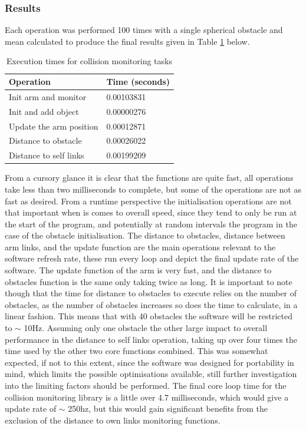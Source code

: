 \documentclass[a4paper, 11.5pt, conference]{ieeeconf}      %
\begin{document}
\subsubsection{Results}
Each operation was performed 100 times with a single spherical obstacle and mean calculated to produce the final results given in Table \ref{table:Function Times} below.

\begin{table}[H]
	\centering
	\begin{tabular}{|l|l|}
		\hline
		Operation & Time (seconds) \\ \hline
		Init arm and monitor   & 0.00103831     \\ \hline
		Init and add object    & 0.00000276     \\ \hline
		Update the arm position& 0.00012871     \\ \hline
		Distance to obstacle   & 0.00026022     \\ \hline
		Distance to self links & 0.00199209     \\ \hline
	\end{tabular}
	\caption{Execution times for collision monitoring tasks}
	\label{table:Function Times}
\end{table}
From a cursory glance it is clear that the functions are quite fast, all operations take less than two milliseconds to complete, but some of the operations are not as fast as desired. From a runtime perspective the initialisation operations are not that important when is comes to overall speed, since they tend to only be run at the start of the program, and potentially at random intervals the program in the case of the obstacle initialisation. The distance to obstacles, distance between arm links, and the update function are the main operations relevant to the software refresh rate, these run every loop and depict the final update rate of the software. The update function of the arm is very fast, and the distance to obstacles function is the same only taking twice as long. It is important to note though that the time for distance to obstacles to execute relies on the number of obstacles, as the number of obstacles increases so does the time to calculate, in a linear fashion. This means that with 40 obstacles the software will be restricted to $\sim$ 10Hz. Assuming only one obstacle the other large impact to overall performance in the distance to self links operation, taking up over four times the time used by the other two core functions combined. This was somewhat expected, if not to this extent, since the software was designed for portability in mind, which limits the possible optimisations available, still further investigation into the limiting factors should be performed. The final core loop time for the collision monitoring library is a little over 4.7 milliseconds, which would give a update rate of $\sim$ 250hz, but this would gain significant benefits from the exclusion of the distance to own links monitoring functions.
\end{document}
